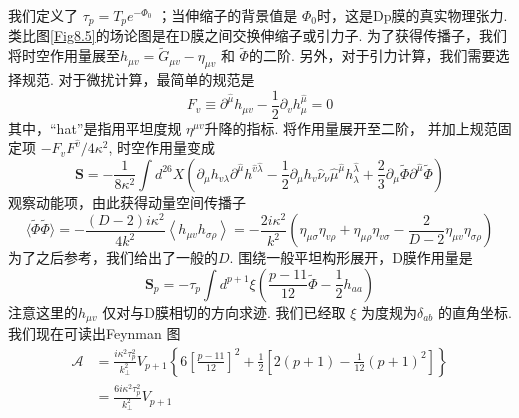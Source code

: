 我们定义了 $\tau_{p}=T_{p} e^{-\Phi_{0}} $ ；当伸缩子的背景值是 $\Phi_{0}$时，这是Dp膜的真实物理张力.\\
类比图\ref{Fig8.5}的场论图是在D膜之间交换伸缩子或引力子. 为了获得传播子，我们将时空作用量展至$h_{\mu v}=\tilde{G}_{\mu v}-\eta_{\mu v}$ 和 $\tilde{\Phi}$的二阶. 另外，对于引力计算，我们需要选择规范. 对于微扰计算，最简单的规范是
\begin{equation}
	F_{v} \equiv \partial^{\hat{\mu}} h_{\mu v}-\frac{1}{2} \partial_{v} h^{\hat{\mu}}_{\mu}=0
\end{equation}
其中，“hat”是指用平坦度规 $\eta^{\mu v} $升降的指标. 将作用量展开至二阶， 并加上规范固定项 $-F_{v} F^{\hat{v}} / 4 \kappa^{2}$, 时空作用量变成
\begin{equation}
	\boldsymbol{S}=-\frac{1}{8 \kappa^{2}} \int d^{26} X\left(\partial_{\mu} h_{v \lambda} \partial^{\hat{\mu}} h^{\hat{v} \hat{\lambda}}-\frac{1}{2} \partial_{\mu} h_{v} \hat{\nu}_{\nu} \hat{\mu}^{\hat{\mu}} h_{\lambda}^{\hat{\lambda}}+\frac{2}{3} \partial_{\mu} \tilde{\Phi} \partial^{\hat{\mu}} \tilde{\Phi}\right)
\end{equation}
观察动能项，由此获得动量空间传播子
\begin{subequations}
\begin{equation}
		\langle\tilde{\Phi} \tilde{\Phi}\rangle =-\frac{(D-2) i \kappa^{2}}{4 k^{2}} 
\end{equation}
\begin{equation}	
		\left\langle h_{\mu v} h_{\sigma \rho}\right\rangle =-\frac{2 i \kappa^{2}}{k^{2}}\left(\eta_{\mu \sigma} \eta_{v \rho}+\eta_{\mu \rho} \eta_{v \sigma}-\frac{2}{D-2} \eta_{\mu v} \eta_{\sigma \rho}\right)
\end{equation}
\end{subequations}
为了之后参考，我们给出了一般的$D$. 围绕一般平坦构形展开，D膜作用量是
\begin{equation}
	\boldsymbol{S}_{p}=-\tau_{p} \int d^{p+1} \xi\left(\frac{p-11}{12} \tilde{\Phi}-\frac{1}{2} h_{a a}\right)
\end{equation}
注意这里的$h_{\mu v}$ 仅对与D膜相切的方向求迹. 我们已经取 $\xi$ 为度规为$\delta_{a b}$
的直角坐标.\\
我们现在可读出Feynman 图
\begin{equation}
	\begin{aligned}
		\mathscr{A} &=\frac{i \kappa^{2} \tau_{p}^{2}}{k_{\perp}^{2}} V_{p+1}\left\{6\left[\frac{p-11}{12}\right]^{2}+\frac{1}{2}\left[2(p+1)-\frac{1}{12}(p+1)^{2}\right]\right\} \\
		&=\frac{6 i \kappa^{2} \tau_{p}^{2}}{k_{\perp}^{2}} V_{p+1}
	\end{aligned}
\end{equation}
